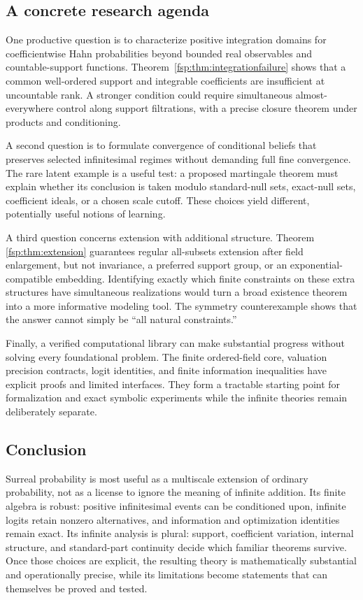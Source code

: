 \documentclass[11pt,a4paper]{article}
\numberwithin{equation}{section}
\theoremstyle{definition}
\theoremstyle{remark}
\begin{document}
\subsection{A concrete research agenda}

One productive question is to characterize positive integration domains
for coefficientwise Hahn probabilities beyond bounded real observables
and countable-support functions. Theorem~\ref{fsp:thm:integrationfailure}
shows that a common well-ordered support and integrable coefficients
are insufficient at uncountable rank. A stronger condition could require
simultaneous almost-everywhere control along support filtrations, with a
precise closure theorem under products and conditioning.

A second question is to formulate convergence of conditional beliefs
that preserves selected infinitesimal regimes without demanding full
fine convergence. The rare latent example is a useful test: a proposed
martingale theorem must explain whether its conclusion is taken modulo
standard-null sets, exact-null sets, coefficient ideals, or a chosen
scale cutoff. These choices yield different, potentially useful notions
of learning.

A third question concerns extension with additional structure. Theorem~
\ref{fsp:thm:extension} guarantees regular all-subsets extension after field
enlargement, but not invariance, a preferred support group, or an
exponential-compatible embedding. Identifying exactly which finite
constraints on these extra structures have simultaneous realizations
would turn a broad existence theorem into a more informative modeling
tool. The symmetry counterexample shows that the answer cannot simply
be ``all natural constraints.''

Finally, a verified computational library can make substantial progress
without solving every foundational problem. The finite ordered-field
core, valuation precision contracts, logit identities, and finite
information inequalities have explicit proofs and limited interfaces.
They form a tractable starting point for formalization and exact symbolic
experiments while the infinite theories remain deliberately separate.

\subsection{Conclusion}

Surreal probability is most useful as a multiscale extension of ordinary
probability, not as a license to ignore the meaning of infinite addition.
Its finite algebra is robust: positive infinitesimal events can be
conditioned upon, infinite logits retain nonzero alternatives, and
information and optimization identities remain exact. Its infinite
analysis is plural: support, coefficient variation, internal structure,
and standard-part continuity decide which familiar theorems survive.
Once those choices are explicit, the resulting theory is mathematically
substantial and operationally precise, while its limitations become
statements that can themselves be proved and tested.
\end{document}
